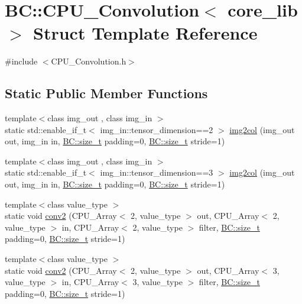 \hypertarget{structBC_1_1CPU__Convolution}{}\section{BC\+:\+:C\+P\+U\+\_\+\+Convolution$<$ core\+\_\+lib $>$ Struct Template Reference}
\label{structBC_1_1CPU__Convolution}


{\ttfamily \#include $<$C\+P\+U\+\_\+\+Convolution.\+h$>$}

\subsection*{Static Public Member Functions}
\begin{DoxyCompactItemize}
\item 
{\footnotesize template$<$class img\+\_\+out , class img\+\_\+in $>$ }\\static std\+::enable\+\_\+if\+\_\+t$<$ img\+\_\+in\+::tensor\+\_\+dimension==2 $>$ \hyperlink{structBC_1_1CPU__Convolution_a46822fa47314dcc4ecb7cc91d70d4825}{img2col} (img\+\_\+out out, img\+\_\+in in, \hyperlink{namespaceBC_a6007cbc4eeec401a037b558910a56173}{B\+C\+::size\+\_\+t} padding=0, \hyperlink{namespaceBC_a6007cbc4eeec401a037b558910a56173}{B\+C\+::size\+\_\+t} stride=1)
\item 
{\footnotesize template$<$class img\+\_\+out , class img\+\_\+in $>$ }\\static std\+::enable\+\_\+if\+\_\+t$<$ img\+\_\+in\+::tensor\+\_\+dimension==3 $>$ \hyperlink{structBC_1_1CPU__Convolution_a196b73002daac739c6ecb0bbd0475609}{img2col} (img\+\_\+out out, img\+\_\+in in, \hyperlink{namespaceBC_a6007cbc4eeec401a037b558910a56173}{B\+C\+::size\+\_\+t} padding=0, \hyperlink{namespaceBC_a6007cbc4eeec401a037b558910a56173}{B\+C\+::size\+\_\+t} stride=1)
\item 
{\footnotesize template$<$class value\+\_\+type $>$ }\\static void \hyperlink{structBC_1_1CPU__Convolution_a5a26b368ec0395d887ce95a3ccbbe3d5}{conv2} (C\+P\+U\+\_\+\+Array$<$ 2, value\+\_\+type $>$ out, C\+P\+U\+\_\+\+Array$<$ 2, value\+\_\+type $>$ in, C\+P\+U\+\_\+\+Array$<$ 2, value\+\_\+type $>$ filter, \hyperlink{namespaceBC_a6007cbc4eeec401a037b558910a56173}{B\+C\+::size\+\_\+t} padding=0, \hyperlink{namespaceBC_a6007cbc4eeec401a037b558910a56173}{B\+C\+::size\+\_\+t} stride=1)
\item 
{\footnotesize template$<$class value\+\_\+type $>$ }\\static void \hyperlink{structBC_1_1CPU__Convolution_a98cde461401a1f60176b7ab8802f0071}{conv2} (C\+P\+U\+\_\+\+Array$<$ 2, value\+\_\+type $>$ out, C\+P\+U\+\_\+\+Array$<$ 3, value\+\_\+type $>$ in, C\+P\+U\+\_\+\+Array$<$ 3, value\+\_\+type $>$ filter, \hyperlink{namespaceBC_a6007cbc4eeec401a037b558910a56173}{B\+C\+::size\+\_\+t} padding=0, \hyperlink{namespaceBC_a6007cbc4eeec401a037b558910a56173}{B\+C\+::size\+\_\+t} stride=1)
\end{DoxyCompactItemize}


